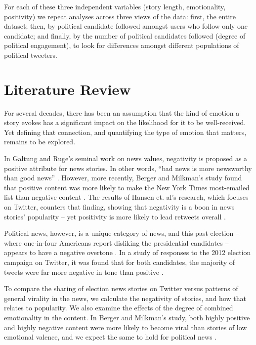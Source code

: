 \documentclass[letterpaper]{article}
\begin{document}
For each of these three independent variables (story length, emotionality, positivity) we repeat analyses across three views of the data: first, the entire dataset; then, by political candidate followed amongst users who follow only one candidate; and finally, by the number of political candidates followed (degree of political engagement), to look for differences amongst different populations of political tweeters.

\section{Literature Review}  

For several decades, there has been an assumption that the kind of emotion a story evokes has a significant impact on the likelihood for it to be well-received. Yet defining that connection, and quantifying the type of emotion that matters, remains to be explored.

In Galtung and Ruge's seminal work on news values, negativity is proposed as a positive attribute for news stories. In other words, ``bad news is more newsworthy than good news'' \cite{galtung1965structure}. However, more recently, Berger and Milkman's study found that positive content was more likely to make the New York Times most-emailed list than negative content \cite{berger2012makes}. The results of Hansen et. al’s research, which focuses on Twitter, counters that finding, showing that negativity is a boon in news stories’ popularity -- yet positivity is more likely to lead retweets overall \cite{hansen2011good}.

Political news, however, is a unique category of news, and this past election -- where one-in-four Americans report disliking the presidential candidates -- appears to have a negative overtone \cite{dislike-candidates}. In a study of responses to the 2012 election campaign on Twitter, it was found that for both candidates, the majority of tweets were far more negative in tone than positive \cite{mitchell2013twitter}.
    
To compare the sharing of election news stories on Twitter versus patterns of general virality in the news, we calculate the negativity of stories, and how that relates to popularity. We also examine the effects of the degree of combined emotionality in the content. In Berger and Milkman's study, both highly positive and highly negative content were more likely to become viral than stories of low emotional valence, and we expect the same to hold for political news \cite{berger2012makes}. 
\end{document}
